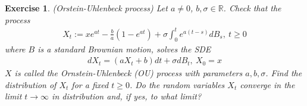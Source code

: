 \documentclass[12pt]{article}
\theoremstyle{colon}
\newtheorem{exercise}{Exercise}
\begin{document}
\clearpage

\begin{exercise}
  (Orstein-Uhlenbeck process) Let $a \neq 0$, $b, \sigma \in \mathbb{R}$. Check that the process
  \begin{gather*}
    X_t := x e^{at} - \frac{b}{a} (1 - e^{at}) + \sigma \int_0^t e^{a(t-s)} d B_s, \ t \geq 0
  \end{gather*}
  where $B$ is a standard Brownian motion, solves the SDE
  \begin{gather*}
    d X_t = (a X_t + b) dt + \sigma d B_t, \ X_0 = x
  \end{gather*}
  $X$ is called the \textit{Ornstein-Uhlenbeck (OU) process} with parameters $a, b, \sigma$. Find the distribution of $X_t$ for a fixed $t \geq 0$. Do the random variables $X_t$ converge in the limit $t \rightarrow \infty$ in distribution and, if yes, to what limit?
\end{exercise}
\end{document}
